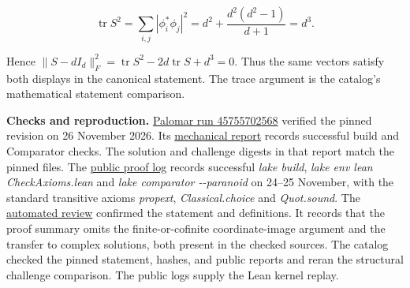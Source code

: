 \documentclass[11pt,a4paper]{article}
\begin{document}
\[\mathop{\mathrm{tr}}\nolimits S^2
=\sum_{i,j}|\phi_i^*\phi_j|^2
=d^2+\frac{d^2(d^2-1)}{d+1}=d^3.\]

Hence
\(\|S-dI_d\|_F^2=\mathop{\mathrm{tr}}\nolimits S^2-2d\mathop{\mathrm{tr}}\nolimits S+d^3=0\).
Thus the same vectors satisfy both displays in the canonical statement.
The trace argument is the catalog's mathematical statement comparison.

\textbf{Checks and reproduction.}
\href{https://github.com/PalomarRegistry/PalomarSubmission/actions/runs/45755702568}{Palomar
run 45755702568} verified the pinned revision on 26 November 2026. Its
\href{https://data.palomar-registry.org/evidence/PALOMAR-2026-11-26-000040-v1/ca365cca899b61b8359b205ff8cff7f600d23ea732e58e377559b773a00f4a43/mechanical-report.json}{mechanical
report} records successful build and Comparator checks. The solution and
challenge digests in that report match the pinned files. The
\href{https://github.com/Hertaspace/sic-povm-lean/blob/e74571352233162adee70895903d82f8465fd054/VERIFICATION.md}{public
proof log} records successful \textit{lake build},
\textit{lake env lean CheckAxioms.lean} and
\textit{lake comparator -\/-paranoid} on 24--25 November, with the
standard transitive axioms \textit{propext}, \textit{Classical.choice}
and \textit{Quot.sound}. The
\href{https://data.palomar-registry.org/evidence/PALOMAR-2026-11-26-000040-v1/ca365cca899b61b8359b205ff8cff7f600d23ea732e58e377559b773a00f4a43/review.json}{automated
review} confirmed the statement and definitions. It records that the
proof summary omits the finite-or-cofinite coordinate-image argument and
the transfer to complex solutions, both present in the checked sources.
The catalog checked the pinned statement, hashes, and public reports and
reran the structural challenge comparison. The public logs supply the
Lean kernel replay.
\end{document}
